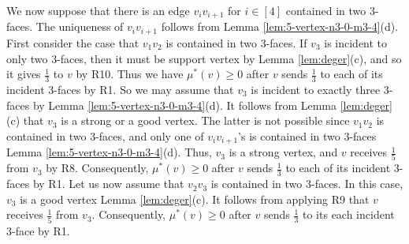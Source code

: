 \documentclass[12pt, reqno]{amsart}
\theoremstyle{plain}
\theoremstyle{definition}
\numberwithin{equation}{section}
\begin{document}



We now suppose that there is an edge $v_iv_{i+1}$ for $i\in [4]$ contained in two $3$-faces. The uniqueness of $v_iv_{i+1}$ follows from Lemma \ref{lem:5-vertex-n3-0-m3-4}(d). 
First consider the case that $v_1v_2$ is contained in two $3$-faces. If  $v_3$ is incident to only two $3$-faces, then it must be support vertex by Lemma \ref{lem:deger}(c), and so it gives $\frac{1}{3}$ to $v$ by R10. Thus we have  $\mu^*(v)\geq 0$ after $v$ sends $\frac{1}{3}$ to each of its incident $3$-faces by R1. So we may assume that  $v_3$ is incident to exactly three $3$-faces by Lemma \ref{lem:5-vertex-n3-0-m3-4}(d). 
It follows from Lemma \ref{lem:deger}(c) that $v_3$ is a strong or a good vertex. The latter is not possible since $v_1v_2$ is contained in two $3$-faces, and only one of $v_iv_{i+1}$'s is contained in two $3$-faces Lemma \ref{lem:5-vertex-n3-0-m3-4}(d). Thus, $v_3$ is a strong vertex, and $v$ receives  $\frac{1}{5}$ from $v_3$ by R8. Consequently,  $\mu^*(v)\geq 0$ after $v$ sends $\frac{1}{3}$ to each of its incident $3$-faces by R1.
Let us now assume that $v_2v_3$ is contained in two $3$-faces. In this case, $v_3$ is a good vertex Lemma \ref{lem:deger}(c). It follows from applying R9 that $v$ receives $\frac{1}{5}$ from $v_3$. Consequently,  $\mu^*(v)\geq 0$ after $v$ sends $\frac{1}{3}$ to its each incident $3$-face by R1. \medskip
\end{document}
